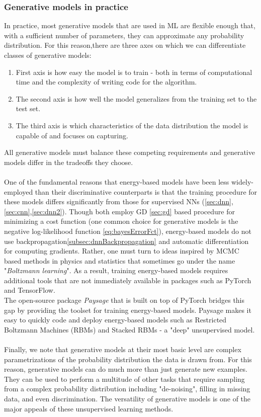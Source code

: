 \subsubsection{Generative models in practice}
In practice, most generative models that are used in ML are flexible enough that, with a sufficient number of parameters, they can approximate any probability distribution. For this reason,there are three axes on which we can differentiate classes of generative models:
\begin{enumerate}
	\item First axis is how easy the model is to train - both in terms of computational time and the complexity of writing code for the algorithm.
	\item The second axis is how well the model generalizes from the training set to the test set.
	\item The third axis is which characteristics of the data distribution the model is capable of and focuses on capturing.
\end{enumerate}
All generative models must balance these competing requirements and generative models differ in the tradeoffs they choose.\\
\\
One of the fundamental reasons that energy-based models have been less widely-employed than their discriminative counterparts is that the training procedure for these models differs significantly from those for supervised NNs (\ref{sec:dnn},\ref{sec:cnn},\ref{sec:dnn2}). Though both employ GD \ref{sec:gd} based procedure for minimizing a cost function (one common choice for generative models is the negative log-likelihood function \ref{eq:bayesErrorFct}), energy-based models do not use backpropagation\ref{subsec:dnnBackpropagation} and automatic differentiation for computing gradients. Rather, one must turn to ideas inspired by MCMC based methods in physics and statistics that sometimes go under the name "\emph{Boltzmann learning}". As a result, training energy-based models requires additional tools that are not immediately available in packages such as PyTorch and TensorFlow.\\
The open-source package \emph{Paysage} that is built on top of PyTorch bridges this gap by providing the toolset for training energy-based models. Paysage makes it easy to quickly code and deploy energy-based models such as Restricted Boltzmann Machines (RBMs) and Stacked RBMs - a "deep" unsupervised model.\\
\\
	Finally, we note that generative models at their most basic level are complex parametrizations of the probability distribution the data is drawn from. For this reason, generative models can do much more than just generate new examples. They can be used to perform a multitude of other tasks that require sampling from a complex probability distribution including "de-noising", filling in missing data, and even discrimination. The versatility of generative models is one of the major appeals of these unsupervised learning methods.


